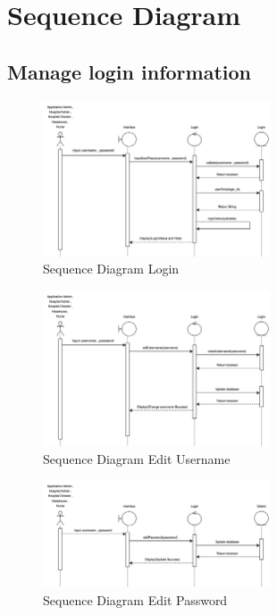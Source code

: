 \baselineskip=8mm
\renewcommand{\thesubsection}{\arabic{subsection}.}
\renewcommand{\theequation}{\thesection.\arabic{equation}}
\renewcommand{\thesection}{}
\renewcommand{\thesubsubsection}{\thesubsection\arabic{subsubsection}.}


\section{Sequence Diagram}

\subsection{Manage login information}

\begin{figure}[h]
    \centering
    \includegraphics[width=0.6\textwidth]{Sequence 1.1.png}
    \caption{Sequence Diagram Login}
    \end{figure}

\begin{figure}[h]
    \centering
    \includegraphics[width=0.6\textwidth]{Sequence 1.2.png}
    \caption{Sequence Diagram Edit Username}
    \end{figure}

\begin{figure}[h]
    \centering
    \includegraphics[width=0.6\textwidth]{Sequence 1.2.1.png}
    \caption{Sequence Diagram Edit Password}
\end{figure}

